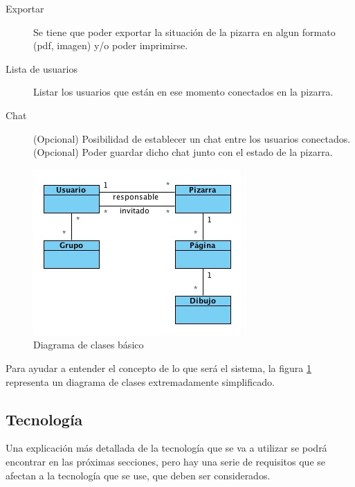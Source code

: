 \begin{description}
	\item[Exportar] Se tiene que poder exportar la situación de la pizarra en algun formato (pdf, imagen) y/o poder imprimirse.
	\item[Lista de usuarios] Listar los usuarios que están en ese momento conectados en la pizarra.
	\item[Chat] (Opcional) Posibilidad de establecer un chat entre los usuarios conectados. (Opcional) Poder guardar dicho chat junto con el estado de la pizarra.
\end{description}

\begin{figure}[h]
\centering
\includegraphics{Diagramadeclase1.jpg}
\caption{Diagrama de clases básico}\label{fig:diagramaclases}
\end{figure}

Para ayudar a entender el concepto de lo que será el sistema, la figura \ref{fig:diagramaclases} representa un diagrama de clases extremadamente simplificado.


\subsection{Tecnología}
Una explicación más detallada de la tecnología que se va a utilizar se podrá encontrar en las próximas secciones, pero hay una serie de requisitos que se afectan a la tecnología que se use, que deben ser considerados.

